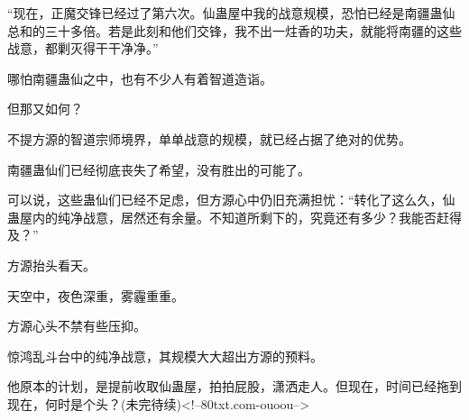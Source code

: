 \begin{this_body}
“现在，正魔交锋已经过了第六次。仙蛊屋中我的战意规模，恐怕已经是南疆蛊仙总和的三十多倍。若是此刻和他们交锋，我不出一炷香的功夫，就能将南疆的这些战意，都剿灭得干干净净。”

哪怕南疆蛊仙之中，也有不少人有着智道造诣。

但那又如何？

不提方源的智道宗师境界，单单战意的规模，就已经占据了绝对的优势。

南疆蛊仙们已经彻底丧失了希望，没有胜出的可能了。

可以说，这些蛊仙们已经不足虑，但方源心中仍旧充满担忧：“转化了这么久，仙蛊屋内的纯净战意，居然还有余量。不知道所剩下的，究竟还有多少？我能否赶得及？”

方源抬头看天。

天空中，夜色深重，雾霾重重。

方源心头不禁有些压抑。

惊鸿乱斗台中的纯净战意，其规模大大超出方源的预料。

他原本的计划，是提前收取仙蛊屋，拍拍屁股，潇洒走人。但现在，时间已经拖到现在，何时是个头？(未完待续)<!--80txt.com-ouoou-->

\end{this_body}

